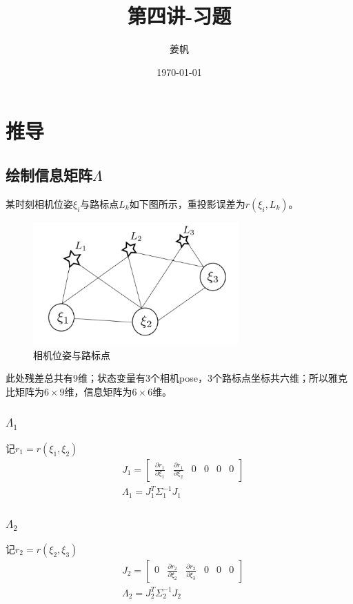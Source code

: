 \documentclass[UTF8]{ctexart}
\title{第四讲-习题}
\author{姜帆}
\date{\today}
\begin{document}
\maketitle
\tableofcontents
\newpage
\section{推导}
\subsection{绘制信息矩阵$\Lambda$}
\indent 某时刻相机位姿$\xi _i$与路标点$L _k$如下图所示，重投影误差为$r(\xi _i,L _k)$。\\
\begin{figure}[H]
\centering
\includegraphics[width=0.7\textwidth]{1_1.png}    
\caption{相机位姿与路标点}
\label{img0}
\end{figure}
\indent 此处残差总共有9维；状态变量有3个相机pose，3个路标点坐标共六维；所以雅克比矩阵为$6\times9$维，信息矩阵为$6 \times 6$维。\\
\subsubsection{$\Lambda_1$}
\indent 记$r_1=r(\xi _1,\xi _2)$ \\
\begin{equation}
\begin{aligned}
&J_1= \begin{bmatrix}
    \frac{\partial r_1}{\partial \xi _1} & \frac{\partial r_1}{\partial \xi _2} &0 &0 &0 &0 
    \end{bmatrix}\\
&\Lambda_1=J_1^T\Sigma_1^{-1}J_1
\end{aligned}
\end{equation}

\subsubsection{$\Lambda_2$}
\indent 记$r_2=r(\xi _2,\xi _3)$ \\
\begin{equation}
\begin{aligned}
&J_2= \begin{bmatrix}
    0 & \frac{\partial r_2}{\partial \xi _2} &\frac{\partial r_2}{\partial \xi _3} &0 &0 &0 
    \end{bmatrix}\\
&\Lambda_2=J_2^T\Sigma_2^{-1}J_2
\end{aligned}
\end{equation}
\end{document}
